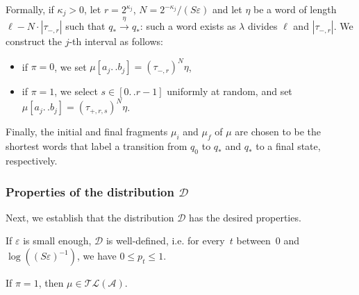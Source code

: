 \documentclass[letterpaper, USenglish, cleveref, autoref, thm-restate, numberwithinsect]{lipics-v2021}
\theoremstyle{theorem}
\theoremstyle{definition}
\newcommand{\Aa}{\mathcal{A}}
\newcommand{\dd}{.\,.}
\newcommand{\Dd}{\mathcal{D}}
\newcommand{\eps}{\varepsilon}
\newcommand{\timedlang}[1]{\mathcal{TL}( #1 )}
\begin{document}
Formally, if $\kappa_j > 0$, let $r = 2^{\kappa_j}$, $N = 2^{-\kappa_j}/( S\eps)$
and let $\eta$ be a word of length $\ell - N\cdot |\tau_{-,r}|$ such that $q_* \xrightarrow{\eta} q_*$: such a word exists as $\lambda$ divides $\ell$ and $|\tau_{-,r}|$.
We construct the $j$-th interval as follows:
\begin{itemize}
     \item if $\pi = 0$, we set $\mu[a_j\dd b_j] = (\tau_{-,r})^N\eta$,
     \item if $\pi = 1$, we select $s\in [0\dd  r-1]$ uniformly at random, and set $\mu[a_j\dd b_j] = (\tau_{+,r,s})^N\eta$.
\end{itemize}
Finally, the initial and final fragments $\mu_i$ and $\mu_f$ of $\mu$ are chosen to be the shortest words that label a transition from $q_0$ to $q_*$ and $q_*$ to a final state, respectively.

\subsubsection{Properties of the distribution $\Dd$}
Next, we establish that the distribution $\Dd$ has the desired properties.
\begin{observation}
    If $\eps$ is small enough, $\Dd$ is well-defined, i.e. for every~$t$ between~$0$ and $\log(( S\eps)^{-1})$, we have $0 \le p_t \le 1$.
\end{observation}

\begin{observation}
    If $\pi = 1$, then $\mu\in \timedlang{\Aa}$.
\end{observation}
\end{document}
